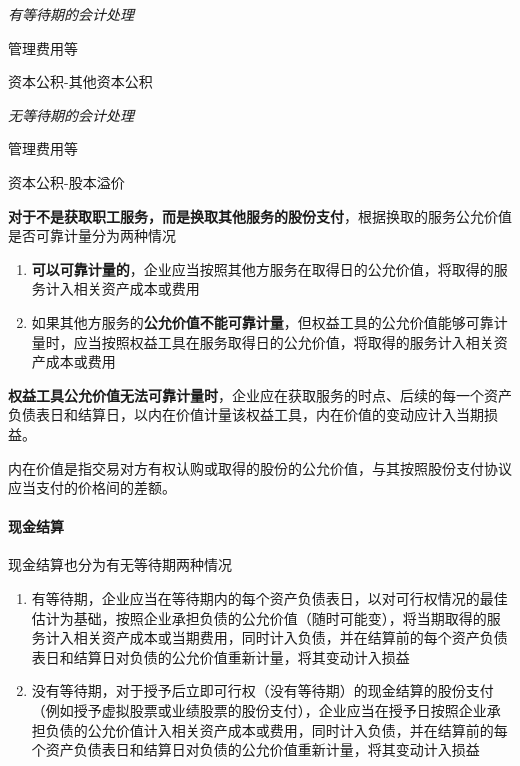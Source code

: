 \documentclass[UTF8,12pt]{ctexart}
\newenvironment{Dr}{%
	\begin{list}{}%
		{
			\setlength{\leftmargin}{2em}
			\setlength{\labelwidth}{2em}
			\setlength{\labelsep}{0pt}
			\setlength{\itemindent}{0pt}
			\setlength{\listparindent}{0pt}
			\setlength{\parsep}{0pt}
			\setlength{\topsep}{0pt}
		}
		\item[\textbf{借：}]
	}{%
	\end{list}
}
\newenvironment{Cr}{%
	\begin{list}{}%
		{
			\setlength{\leftmargin}{3em}
			\setlength{\labelwidth}{2em}
			\setlength{\labelsep}{0pt}
			\setlength{\itemindent}{0pt}
			\setlength{\listparindent}{0pt}
			\setlength{\parsep}{0pt}
			\setlength{\topsep}{0pt}
		}
		\item[\textbf{贷：}]
	}{%
	\end{list}
}
\numberwithin{equation}{section} %
\numberwithin{figure}{section}
\numberwithin{table}{section}
\begin{document}
	\textit{有等待期的会计处理}
	
	\begin{Dr}
		管理费用等
	\end{Dr}
	\begin{Cr}
		资本公积-其他资本公积
	\end{Cr}

	\textit{无等待期的会计处理}
	
	\begin{Dr}
		管理费用等
	\end{Dr}
	\begin{Cr}
		资本公积-股本溢价
	\end{Cr}

	\textbf{对于不是获取职工服务，而是换取其他服务的股份支付}，根据换取的服务公允价值是否可靠计量分为两种情况
	\begin{enumerate}
		\item \textbf{可以可靠计量的}，企业应当按照其他方服务在取得日的公允价值，将取得的服务计入相关资产成本或费用
		
		\item 如果其他方服务的\textbf{公允价值不能可靠计量}，但权益工具的公允价值能够可靠计量时，应当按照权益工具在服务取得日的公允价值，将取得的服务计入相关资产成本或费用
	\end{enumerate}

	\textbf{权益工具公允价值无法可靠计量时}，企业应在获取服务的时点、后续的每一个资产负债表日和结算日，以内在价值计量该权益工具，内在价值的变动应计入当期损益。
	
	内在价值是指交易对方有权认购或取得的股份的公允价值，与其按照股份支付协议应当支付的价格间的差额。
	
	\paragraph{现金结算}
	
	现金结算也分为有无等待期两种情况
	
	\begin{enumerate}
		\item 有等待期，企业应当在等待期内的每个资产负债表日，以对可行权情况的最佳估计为基础，按照企业承担负债的公允价值（随时可能变），将当期取得的服务计入相关资产成本或当期费用，同时计入负债，并在结算前的每个资产负债表日和结算日对负债的公允价值重新计量，将其变动计入损益
		
		\item 没有等待期，对于授予后立即可行权（没有等待期）的现金结算的股份支付（例如授予虚拟股票或业绩股票的股份支付），企业应当在授予日按照企业承担负债的公允价值计入相关资产成本或费用，同时计入负债，并在结算前的每个资产负债表日和结算日对负债的公允价值重新计量，将其变动计入损益
	\end{enumerate}
	
\end{document}
